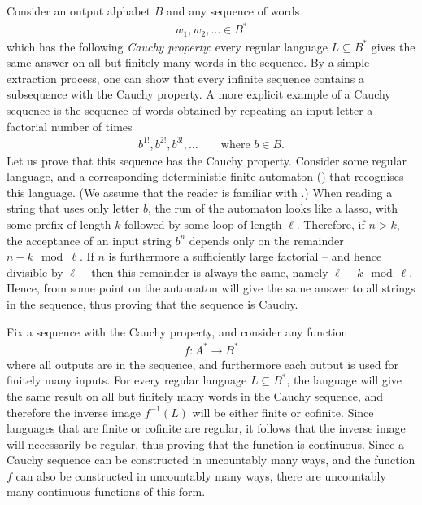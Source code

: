 \begin{myexample}\label{ex:uncountably-many-continuous}
    Consider an output alphabet $B$ and any sequence of words 
    \begin{align*}
    w_1, w_2, \ldots \in B^*
    \end{align*}
    which has the following \emph{Cauchy property}: every regular language $L \subseteq B^*$ gives the same answer on all but finitely many words in the sequence. By a simple extraction process, one can show that every infinite sequence contains a subsequence with the Cauchy property. A more explicit example of a Cauchy sequence is the sequence of words obtained by repeating an input letter a  factorial number of times
    \begin{align*}
    b^{1!}, b^{2!}, b^{3!},\ldots \qquad \text{where $b \in B$.}
    \end{align*}
    Let us prove that this sequence has the Cauchy property. Consider some regular language, and a corresponding  deterministic finite automaton (\dfa) that recognises this language. (We assume that the reader is familiar with \dfa.)  When reading a string that uses only letter $b$, the run of the automaton looks like a lasso, with some prefix of  length $k$ followed by  some loop of length $\ell$. Therefore, if  $n > k$, the acceptance of an input string $b^n$ depends only on  the remainder $n-k \mod \ell$. If $n$ is furthermore  a sufficiently large factorial -- and hence divisible by $\ell$ --  then this remainder is always the same, namely $\ell - k \mod \ell$. Hence, from some point on the automaton will give the same answer to all strings in the sequence, thus proving that the sequence is Cauchy. 

Fix a sequence with the Cauchy property, and consider any function 
    \begin{align*}
    f : A^* \to B^*
    \end{align*}
    where all outputs are in the sequence, and furthermore each output is used for finitely many inputs. For every regular language $L \subseteq B^*$, the language will give the same result on all but finitely many words in the Cauchy sequence, and therefore the inverse image $f^{-1}(L)$ will be either finite or cofinite. Since languages that are finite or cofinite are regular, it follows that the inverse image will necessarily be regular, thus proving that the function is continuous. Since a Cauchy sequence can be constructed in uncountably many ways, and the function $f$ can also be constructed in uncountably many ways, there are uncountably many continuous functions of this form.
\end{myexample}

